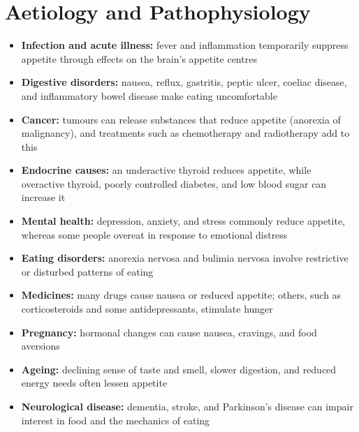\section*{Aetiology and Pathophysiology}
\begin{itemize}
    \item \textbf{Infection and acute illness:} fever and inflammation temporarily suppress appetite through effects on the brain's appetite centres
    \item \textbf{Digestive disorders:} nausea, reflux, gastritis, peptic ulcer, coeliac disease, and inflammatory bowel disease make eating uncomfortable
    \item \textbf{Cancer:} tumours can release substances that reduce appetite (anorexia of malignancy), and treatments such as chemotherapy and radiotherapy add to this
    \item \textbf{Endocrine causes:} an underactive thyroid reduces appetite, while overactive thyroid, poorly controlled diabetes, and low blood sugar can increase it
    \item \textbf{Mental health:} depression, anxiety, and stress commonly reduce appetite, whereas some people overeat in response to emotional distress
    \item \textbf{Eating disorders:} anorexia nervosa and bulimia nervosa involve restrictive or disturbed patterns of eating
    \item \textbf{Medicines:} many drugs cause nausea or reduced appetite; others, such as corticosteroids and some antidepressants, stimulate hunger
    \item \textbf{Pregnancy:} hormonal changes can cause nausea, cravings, and food aversions
    \item \textbf{Ageing:} declining sense of taste and smell, slower digestion, and reduced energy needs often lessen appetite
    \item \textbf{Neurological disease:} dementia, stroke, and Parkinson's disease can impair interest in food and the mechanics of eating
\end{itemize}

